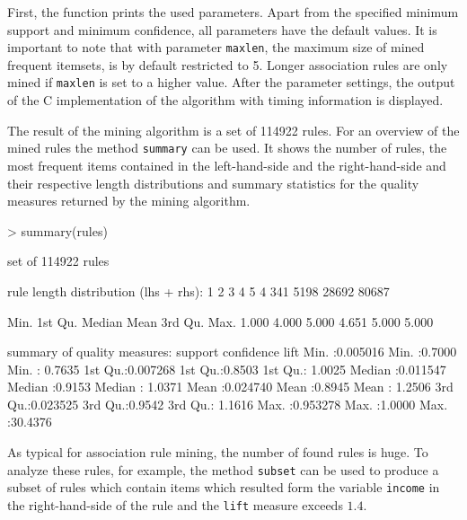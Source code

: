 \documentclass[10pt,a4paper]{article}
\newcommand{\code}[1]{\texttt{#1}}
\newcommand{\proglang}[1]{\textsf{#1}}
\begin{document}
%

First, the function prints the used parameters.  Apart from the
specified minimum support and minimum confidence, all parameters have
the default values. It is important to note that with parameter
\code{maxlen}, the maximum size of mined frequent itemsets, is by
default restricted to 5.  Longer association rules are only mined if
\code{maxlen} is set to a higher value.  After the parameter settings,
the output of the \proglang{C} implementation of the algorithm with timing
information is displayed.

The result of the mining algorithm is a set of 114922
rules.  For an overview of the mined rules the method \code{summary}
can be used.  It shows the number of rules, the most frequent items
contained in the left-hand-side and the right-hand-side and their
respective length distributions and summary statistics for the quality
measures returned by the mining algorithm.

\begin{Schunk}
\begin{Sinput}
> summary(rules)
\end{Sinput}
\begin{Soutput}
set of 114922 rules

rule length distribution (lhs + rhs):
    1     2     3     4     5 
    4   341  5198 28692 80687 

   Min. 1st Qu.  Median    Mean 3rd Qu.    Max. 
  1.000   4.000   5.000   4.651   5.000   5.000 

summary of quality measures:
    support           confidence          lift        
 Min.   :0.005016   Min.   :0.7000   Min.   : 0.7635  
 1st Qu.:0.007268   1st Qu.:0.8503   1st Qu.: 1.0025  
 Median :0.011547   Median :0.9153   Median : 1.0371  
 Mean   :0.024740   Mean   :0.8945   Mean   : 1.2506  
 3rd Qu.:0.023525   3rd Qu.:0.9542   3rd Qu.: 1.1616  
 Max.   :0.953278   Max.   :1.0000   Max.   :30.4376  
\end{Soutput}
\end{Schunk}

As typical for association rule mining, the number of found rules is
huge.  To analyze these rules, for example, the method \code{subset}
can be used to produce a subset of rules which contain items which
resulted form the variable \code{income} in the right-hand-side of the
rule and the \code{lift} measure exceeds $1.4$.
\end{document}
